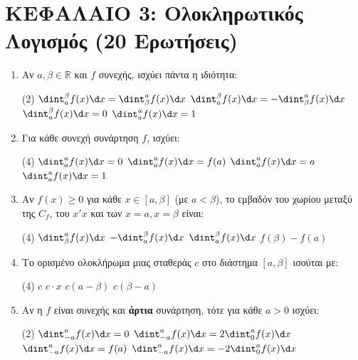 \section*{ΚΕΦΑΛΑΙΟ 3: Ολοκληρωτικός Λογισμός (20 Ερωτήσεις)}

\begin{enumerate}[label=\textbf{3.\arabic*.}, itemsep=4mm]
    \item Αν $a, \beta \in \mathbb{R}$ και $f$ συνεχής, ισχύει πάντα η ιδιότητα:
    \begin{tasks}[label=\let\textdexiakeraia\relax\alph*.](2)
        \task $\dint_a^\beta f(x) \d x = \dint_\beta^a f(x) \d x$
        \task $\dint_a^\beta f(x) \d x = - \dint_\beta^a f(x) \d x$
        \task $\dint_a^\beta f(x) \d x = 0$
        \task $\dint_a^a f(x) \d x = 1$
    \end{tasks}

    \item Για κάθε συνεχή συνάρτηση $f$, ισχύει:
    \begin{tasks}[label=\let\textdexiakeraia\relax\alph*.](4)
        \task $\dint_a^a f(x) \d x = 0$
        \task $\dint_a^a f(x) \d x = f(a)$
        \task $\dint_a^a f(x) \d x = a$
        \task $\dint_a^a f(x) \d x = 1$
    \end{tasks}

    \item Αν $f(x) \ge 0$ για κάθε $x \in [a, \beta]$ (με $a < \beta$), το εμβαδόν του χωρίου μεταξύ της $C_f$, του $x'x$ και των $x=a, x=\beta$ είναι:
    \begin{tasks}[label=\let\textdexiakeraia\relax\alph*.](4)
        \task $\dint_\beta^a f(x) \d x$
        \task $-\dint_a^\beta f(x) \d x$
        \task $\dint_a^\beta f(x) \d x$
        \task $f(\beta) - f(a)$
    \end{tasks}

    \item Το ορισμένο ολοκλήρωμα μιας σταθεράς $c$ στο διάστημα $[a, \beta]$ ισούται με:
    \begin{tasks}[label=\let\textdexiakeraia\relax\alph*.](4)
        \task $c$
        \task $c \cdot x$
        \task $c(a - \beta)$
        \task $c(\beta - a)$
    \end{tasks}

    \item Αν η $f$ είναι συνεχής και \textbf{άρτια} συνάρτηση, τότε για κάθε $a > 0$ ισχύει:
    \begin{tasks}[label=\let\textdexiakeraia\relax\alph*.](2)
        \task $\dint_{-a}^a f(x) \d x = 0$
        \task $\dint_{-a}^a f(x) \d x = 2\dint_0^a f(x) \d x$
        \task $\dint_{-a}^a f(x) \d x = f(a)$
        \task $\dint_{-a}^a f(x) \d x = -2\dint_0^a f(x) \d x$
    \end{tasks}


\end{enumerate}

